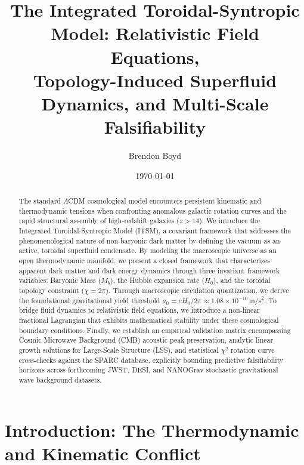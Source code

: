 \documentclass[aps,prd,10pt,twocolumn,superscriptaddress,nofootinbib]{revtex4-2}
\begin{document}
\title{The Integrated Toroidal-Syntropic Model: Relativistic Field Equations, \texorpdfstring{\\}{} Topology-Induced Superfluid Dynamics, and Multi-Scale Falsifiability}

\author{Brendon Boyd}

\date{\today}

\begin{abstract}
The standard $\Lambda$CDM cosmological model encounters persistent kinematic and thermodynamic tensions when confronting anomalous galactic rotation curves and the rapid structural assembly of high-redshift galaxies ($z > 14$). We introduce the Integrated Toroidal-Syntropic Model (ITSM), a covariant framework that addresses the phenomenological nature of non-baryonic dark matter by defining the vacuum as an active, toroidal superfluid condensate. By modeling the macroscopic universe as an open thermodynamic manifold, we present a closed framework that characterizes apparent dark matter and dark energy dynamics through three invariant framework variables: Baryonic Mass ($M_b$), the Hubble expansion rate ($H_0$), and the toroidal topology constraint ($\chi = 2\pi$). Through macroscopic circulation quantization, we derive the foundational gravitational yield threshold $a_0 = c H_0 / 2\pi \approx 1.08 \times 10^{-10}\,\text{m/s}^2$. To bridge fluid dynamics to relativistic field equations, we introduce a non-linear fractional Lagrangian that exhibits mathematical stability under these cosmological boundary conditions. Finally, we establish an empirical validation matrix encompassing Cosmic Microwave Background (CMB) acoustic peak preservation, analytic linear growth solutions for Large-Scale Structure (LSS), and statistical $\chi^2$ rotation curve cross-checks against the SPARC database, explicitly bounding predictive falsifiability horizons across forthcoming JWST, DESI, and NANOGrav stochastic gravitational wave background datasets.
\end{abstract}

\maketitle

\section{\label{sec:intro}Introduction: The Thermodynamic and Kinematic Conflict}
\end{document}
